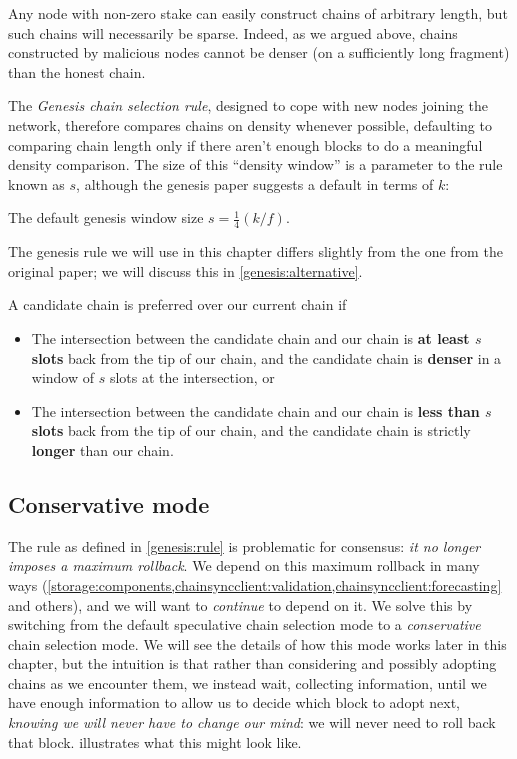 Any node with non-zero stake can easily construct chains of arbitrary length,
but such chains will necessarily be sparse. Indeed, as we argued above,
chains constructed by malicious nodes cannot be denser (on a sufficiently
long fragment) than the honest chain.

The \emph{Genesis chain selection rule}, designed to cope with new nodes joining
the network, therefore compares chains on density whenever possible, defaulting
to comparing chain length only if there aren't enough blocks to do a meaningful
density comparison. The size of this ``density window'' is a parameter to the
rule known as $s$, although the genesis paper \cite{cryptoeprint:2018:378}
suggests a default in terms of $k$:

\begin{definition}
The default genesis window size $s = \frac{1}{4}(k / f)$.
\end{definition}

The genesis rule we will use in this chapter differs slightly from the one from
the original paper; we will discuss this in \cref{genesis:alternative}.

\begin{definition}
\label{genesis:rule}
A candidate chain is preferred over our current chain if

\begin{itemize}
\item The intersection between the candidate chain and our chain is \textbf{at
least $s$ slots} back from the tip of our chain, and the candidate chain is
\textbf{denser} in a window of $s$ slots at the intersection, or

\item The intersection between the candidate chain and our chain is \textbf{less
than $s$ slots} back from the tip of our chain, and the candidate chain is
strictly \textbf{longer} than our chain.
\end{itemize}

\end{definition}

\subsection{Conservative mode}

The rule as defined in \cref{genesis:rule} is problematic for consensus:
\emph{it no longer imposes a maximum rollback}. We depend on this maximum
rollback in many ways
(\cref{storage:components,chainsyncclient:validation,chainsyncclient:forecasting}
and others), and we will want to \emph{continue} to depend on it. We solve this
by switching from the default speculative chain selection mode to a
\emph{conservative} chain selection mode. We will see the details of how this
mode works later in this chapter, but the intuition is that rather than
considering and possibly adopting chains as we encounter them, we instead wait,
collecting information, until we have enough information to allow us to decide
which block to adopt next, \emph{knowing we will never have to change our mind}:
we will never need to roll back that block. 
illustrates what this might look like.

